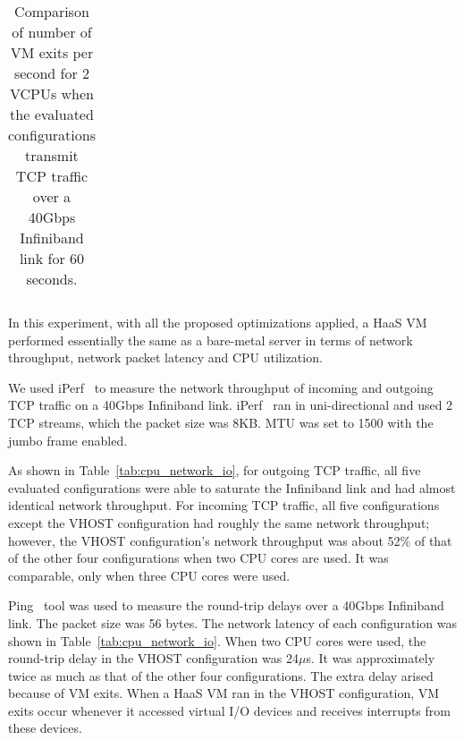 \begin{table*}[t]
{\begin{tabular}{|l|c|c|c|c|c|c|c|c|}
\end{tabular}%
}
\caption{Comparison of number of VM exits per second for 2
VCPUs when the evaluated configurations transmit TCP traffic
over a 40Gbps Infiniband link for 60 seconds.}
\label{tab:vm_exit}
\end{table*}

In this experiment, with all the proposed optimizations
applied, a HaaS VM performed essentially the same as a
bare-metal server in terms of network throughput, network
packet latency and CPU utilization.

We used iPerf~\cite{iperf} to measure the network throughput
of incoming and outgoing TCP traffic on a 40Gbps Infiniband
link. iPerf~\cite{iperf} ran in uni-directional and used 2 TCP
streams, which the packet size was 8KB. MTU was set to 1500
with the jumbo frame enabled.

As shown in Table~\ref{tab:cpu_network_io}, for outgoing
TCP traffic, all five evaluated configurations were able to
saturate the Infiniband link and had almost identical network
throughput. For incoming TCP traffic, all five configurations
except the VHOST configuration had roughly the same network
throughput; however, the VHOST configuration's network
throughput was about 52\% of that of the other four
configurations when two CPU cores are used. It was comparable,
only when three CPU cores were used.

Ping~\cite{ping} tool was used to measure the round-trip
delays over a 40Gbps Infiniband link. The packet size was 56
bytes. The network latency of each configuration was shown in
Table~\ref{tab:cpu_network_io}. When two CPU cores were
used, the round-trip delay in the VHOST configuration was
24$\mu$s. It was approximately twice as much as that of the
other four configurations. The extra delay arised because of
VM exits. When a HaaS VM ran in the VHOST configuration, VM
exits occur whenever it accessed virtual I/O devices and
receives interrupts from these devices.

